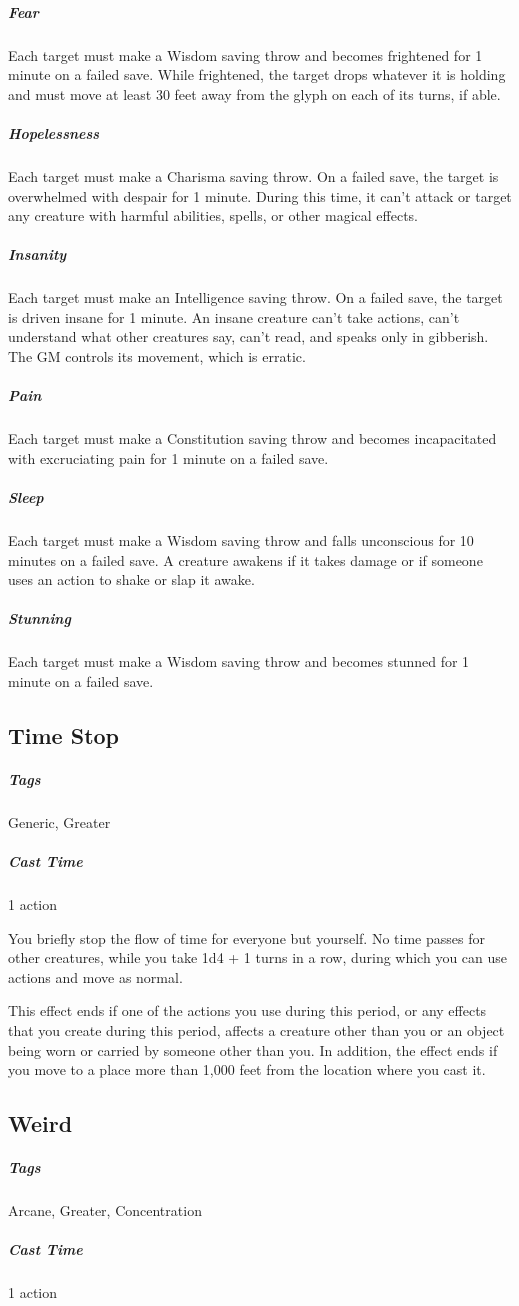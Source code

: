 \subparagraph{Fear} Each target must make a Wisdom saving throw and becomes frightened for 1 minute on a failed save. While frightened, the target drops whatever it is holding and must move at least 30 feet away from the glyph on each of its turns, if able.

\subparagraph{Hopelessness} Each target must make a Charisma saving throw. On a failed save, the target is overwhelmed with despair for 1 minute. During this time, it can't attack or target any creature with harmful abilities, spells, or other magical effects.

\subparagraph{Insanity} Each target must make an Intelligence saving throw. On a failed save, the target is driven insane for 1 minute. An insane creature can't take actions, can't understand what other creatures say, can't read, and speaks only in gibberish. The GM controls its movement, which is erratic.

\subparagraph{Pain} Each target must make a Constitution saving throw and becomes incapacitated with excruciating pain for 1 minute on a failed save.

\subparagraph{Sleep} Each target must make a Wisdom saving throw and falls unconscious for 10 minutes on a failed save. A creature awakens if it takes damage or if someone uses an action to shake or slap it awake.

\subparagraph{Stunning} Each target must make a Wisdom saving throw and becomes stunned for 1 minute on a failed save.

\subsection{Time Stop}\label{spell:time-stop}
\subparagraph*{Tags} Generic, Greater
\subparagraph*{Cast Time} 1 action

You briefly stop the flow of time for everyone but yourself. No time passes for other creatures, while you take 1d4 + 1 turns in a row, during which you can use actions and move as normal.

This effect ends if one of the actions you use during this period, or any effects that you create during this period, affects a creature other than you or an object being worn or carried by someone other than you. In addition, the effect ends if you move to a place more than 1,000 feet from the location where you cast it.

\subsection{Weird}\label{spell:weird}
\subparagraph*{Tags} Arcane, Greater, Concentration
\subparagraph*{Cast Time} 1 action

